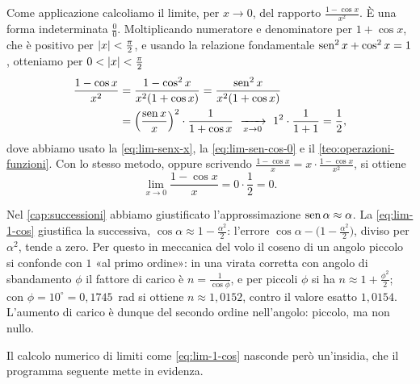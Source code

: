 Come applicazione calcoliamo il limite, per $x\to0$, del rapporto $\frac{1-\cos x}{x^{2}}$.
È una forma indeterminata $\frac00$. Moltiplicando numeratore e denominatore per
$1+\cos x$, che è positivo per $\lvert x\rvert<\frac\pi2$, e usando la relazione fondamentale
$\operatorname{sen}^{2}x+\cos^{2}x=1$, otteniamo per $0<\lvert x\rvert<\frac\pi2$
\begin{equation}\label{eq:lim-1-cos}
\begin{split}
  \frac{1-\cos x}{x^{2}}&=\frac{1-\cos^{2}x}{x^{2}(1+\cos x)}
  =\frac{\operatorname{sen}^{2}x}{x^{2}(1+\cos x)}\\
  &=\Bigl(\frac{\operatorname{sen} x}{x}\Bigr)^{2}\cdot\frac1{1+\cos x}
  \ \xrightarrow[x\to0]{}\ 1^{2}\cdot\frac1{1+1}=\frac12 ,
\end{split}
\end{equation}
dove abbiamo usato la \eqref{eq:lim-senx-x}, la \eqref{eq:lim-sen-cos-0} e il
\cref{teo:operazioni-funzioni}. Con lo stesso metodo, oppure scrivendo
$\frac{1-\cos x}{x}=x\cdot\frac{1-\cos x}{x^{2}}$, si ottiene
\begin{equation}\label{eq:lim-1-cos-x}
  \lim_{x\to0}\frac{1-\cos x}{x}=0\cdot\frac12=0 .
\end{equation}

\begin{idea}
Nel \cref{cap:successioni} abbiamo giustificato l'approssimazione $\operatorname{sen}\alpha\approx\alpha$.
La \eqref{eq:lim-1-cos} giustifica la successiva, $\cos\alpha\approx1-\frac{\alpha^{2}}2$:
l'errore $\cos\alpha-\bigl(1-\frac{\alpha^{2}}2\bigr)$, diviso per $\alpha^{2}$, tende a
zero. Per questo in meccanica del volo il coseno di un angolo piccolo si confonde con
$1$ «al primo ordine»: in una virata corretta con angolo di sbandamento $\phi$ il fattore
di carico è $n=\frac1{\cos\phi}$, e per piccoli $\phi$ si ha
$n\approx1+\frac{\phi^{2}}2$; con $\phi=10^{\circ}=0{,}1745$~rad si ottiene $n\approx1{,}0152$,
contro il valore esatto $1{,}0154$. L'aumento di carico è dunque del secondo ordine
nell'angolo: piccolo, ma non nullo.
\end{idea}

Il calcolo numerico di limiti come \eqref{eq:lim-1-cos} nasconde però un'insidia, che il
programma seguente mette in evidenza.

